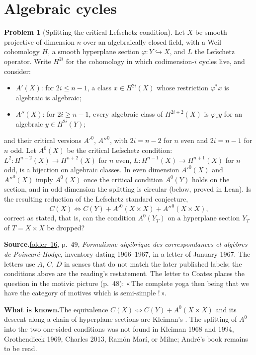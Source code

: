 \documentclass[11pt]{article}
\newcommand{\q}[1]{«\,#1\,»}
\newcommand{\fac}[1]{\href{https://grothendieck.umontpellier.fr/#1.pdf}{folder~#1}}
\theoremstyle{definition}
\newtheorem{problem}{Problem}
\theoremstyle{plain}\newtheorem*{proposition}{Proposition}\theoremstyle{definition}
\newcommand{\entry}[1]{\par\medskip\noindent\textbf{#1}\enspace}
\newcommand{\src}[1]{\entry{Source.}#1}
\newcommand{\known}{\entry{What is known.}}
\begin{document}
\section{Algebraic cycles}

\begin{problem}[Splitting the critical Lefschetz condition]\label{p:lef}
Let $X$ be smooth projective of dimension $n$ over an algebraically closed field, with a Weil cohomology $H$, a smooth hyperplane section $\varphi : Y \hookrightarrow X$, and $L$ the Lefschetz operator. Write $H^{2i}$ for the cohomology in which codimension-$i$ cycles live, and consider:
\begin{itemize}
\item $A'(X)$: for $2i \le n-1$, a class $x \in H^{2i}(X)$ whose restriction $\varphi^*x$ is algebraic is algebraic;
\item $A''(X)$: for $2i \ge n-1$, every algebraic class of $H^{2i+2}(X)$ is $\varphi_*y$ for an algebraic $y \in H^{2i}(Y)$;
\end{itemize}
and their critical versions $A'^{0}$, $A''^{0}$, with $2i = n-2$ for $n$ even and $2i = n-1$ for $n$ odd. Let $A^0(X)$ be the critical Lefschetz condition: $L^2 : H^{n-2}(X) \to H^{n+2}(X)$ for $n$ even, $L : H^{n-1}(X) \to H^{n+1}(X)$ for $n$ odd, is a bijection on algebraic classes. In even dimension $A'^{0}(X)$ and $A''^{0}(X)$ imply $A^0(X)$ once the critical condition $A^0(Y)$ holds on the section, and in odd dimension the splitting is circular (below, proved in Lean). Is the resulting reduction of the Lefschetz standard conjecture,
\[
C(X) \iff C(Y) + A'^{0}(X \times X) + A''^{0}(X \times X),
\]
correct as stated, that is, can the condition $A^0(Y_T)$ on a hyperplane section $Y_T$ of $T = X \times X$ be dropped?
\end{problem}

\src{\fac{16}, p.~49, \emph{Formalisme algébrique des correspondances et algèbres de Poincaré-Hodge}, inventory dating 1966--1967, in a letter of January 1967. The letters use $A$, $C$, $D$ in senses that do not match the later published labels; the conditions above are the reading's restatement. The letter to Coates places the question in the motivic picture (p.~48): \q{The complete yoga then being that we have the category of motives which is semi-simple !}.}

\known The equivalence $C(X) \iff C(Y) + A^0(X \times X)$ and its descent along a chain of hyperplane sections are Kleiman's \cite[Th.~2.13]{kleiman1968}. The splitting of $A^0$ into the two one-sided conditions was not found in Kleiman 1968 and 1994, Grothendieck 1969, Charles 2013, Ramón Marí, or Milne; André's book \cite[ch.~5, \S5.2]{andre} remains to be read.
\end{document}
